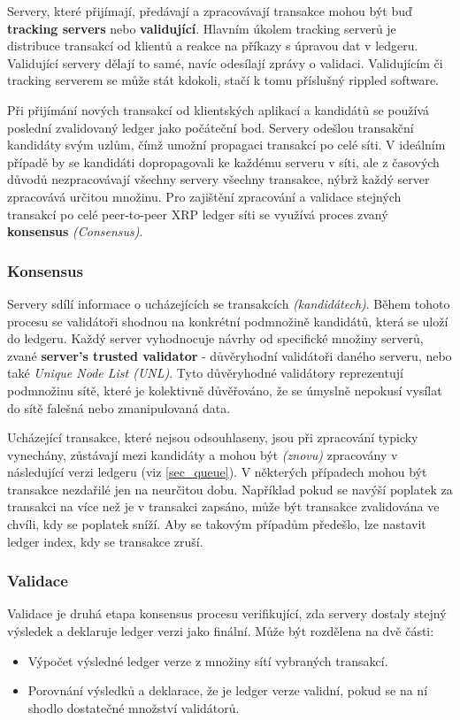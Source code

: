 \documentclass[hidelinks, titlepage]{article}
\begin{document}
Servery, které přijímají, předávají a zpracovávají transakce mohou být buď \textbf{ tracking servers } nebo \textbf{validující}. Hlavním úkolem tracking serverů je distribuce transakcí od klientů a reakce na příkazy s úpravou dat v ledgeru. Validující servery dělají to samé, navíc odesílají zprávy o validaci. Validujícím či tracking serverem se může stát kdokoli, stačí k tomu příslušný rippled software.

Při přijímání nových transakcí od klientských aplikací a kandidátů se používá poslední zvalidovaný ledger jako počáteční bod. Servery odešlou transakční kandidáty svým uzlům, čímž umožní propagaci transakcí po celé síti. V ideálním případě by se kandidáti dopropagovali ke každému serveru v síti, ale z časových důvodů nezpracovávají všechny servery všechny transakce, nýbrž každý server zpracovává určitou množinu. Pro zajištění zpracování a validace stejných transakcí po celé peer-to-peer XRP ledger síti se využívá proces zvaný \textbf{konsensus} \textit{(Consensus)}.

\subsubsection{Konsensus}
Servery sdílí informace o ucházejících se transakcích \textit{(kandidátech)}. Během tohoto procesu se validátoři shodnou na konkrétní podmnožině kandidátů, která se uloží do ledgeru. Každý server vyhodnocuje návrhy od specifické množiny serverů, zvané \textbf{server's trusted validator} - důvěryhodní validátoři daného serveru, nebo také \textit{Unique Node List (UNL)}. Tyto důvěryhodné validátory reprezentují podmnožinu sítě, které je kolektivně důvěřováno, že se úmyslně nepokusí vysílat do sítě falešná nebo zmanipulovaná data.

Ucházející transakce, které nejsou odsouhlaseny, jsou při zpracování typicky vynechány, zůstávají mezi kandidáty a mohou být \textit{(znovu)} zpracovány v následující verzi ledgeru (viz \ref{sec_queue}). V některých případech mohou být transakce nezdařilé jen na neurčitou dobu. Například pokud se navýší poplatek za transakci na více než je v transakci zapsáno, může být transakce zvalidována ve chvíli, kdy se poplatek sníží. Aby se takovým případům předešlo, lze nastavit ledger index, kdy se transakce zruší.

\subsubsection{Validace}
Validace je druhá etapa konsensus procesu verifikující, zda servery dostaly stejný výsledek a deklaruje ledger verzi jako finální. Může být rozdělena na dvě části:
\begin{itemize}
\item Výpočet výsledné ledger verze z množiny sítí vybraných transakcí.
\item Porovnání výsledků a deklarace, že je ledger verze validní, pokud se na ní shodlo dostatečné množství validátorů.
\end{itemize}
\end{document}
